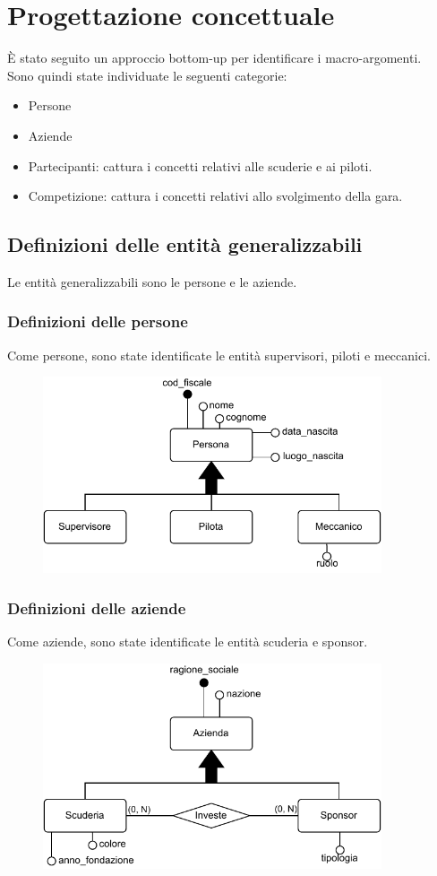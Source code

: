 \documentclass[11pt]{article}
\begin{document}
\section{Progettazione concettuale}
È stato seguito un approccio bottom-up per identificare i macro-argomenti.\\
Sono quindi state individuate le seguenti categorie:
\begin{itemize}
    \item Persone
    \item Aziende
    \item Partecipanti: cattura i concetti relativi alle scuderie e ai piloti.
    \item Competizione: cattura i concetti relativi allo svolgimento della gara.
\end{itemize}

\subsection{Definizioni delle entità generalizzabili}
Le entità generalizzabili sono le persone e le aziende.
\subsubsection{Definizioni delle persone}
Come persone, sono state identificate le entità supervisori, piloti e meccanici. 
\begin{figure}[H]
    \centering
    \includegraphics[width=10cm]{../er/gare_persone.pdf}
\end{figure}

\subsubsection{Definizioni delle aziende}
Come aziende, sono state identificate le entità scuderia e sponsor. 
\begin{figure}[H]
    \centering
    \includegraphics[width=10cm]{../er/gare_aziende.pdf}
\end{figure}
\end{document}

